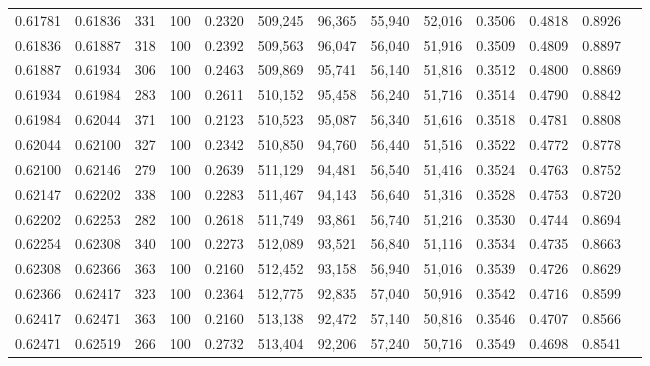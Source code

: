 \begin{tabular}{rrrrrrrrrrrrr}
0.61781 & 0.61836 &   331 & 100 &                                     0.2320 & 509,245 &  96,365 &  55,940 &  52,016 & 0.3506 & 0.4818 & 0.8926 \\
0.61836 & 0.61887 &   318 & 100 &                                     0.2392 & 509,563 &  96,047 &  56,040 &  51,916 & 0.3509 & 0.4809 & 0.8897 \\
0.61887 & 0.61934 &   306 & 100 &                                     0.2463 & 509,869 &  95,741 &  56,140 &  51,816 & 0.3512 & 0.4800 & 0.8869 \\
0.61934 & 0.61984 &   283 & 100 &                                     0.2611 & 510,152 &  95,458 &  56,240 &  51,716 & 0.3514 & 0.4790 & 0.8842 \\
0.61984 & 0.62044 &   371 & 100 &                                     0.2123 & 510,523 &  95,087 &  56,340 &  51,616 & 0.3518 & 0.4781 & 0.8808 \\
0.62044 & 0.62100 &   327 & 100 &                                     0.2342 & 510,850 &  94,760 &  56,440 &  51,516 & 0.3522 & 0.4772 & 0.8778 \\
0.62100 & 0.62146 &   279 & 100 &                                     0.2639 & 511,129 &  94,481 &  56,540 &  51,416 & 0.3524 & 0.4763 & 0.8752 \\
0.62147 & 0.62202 &   338 & 100 &                                     0.2283 & 511,467 &  94,143 &  56,640 &  51,316 & 0.3528 & 0.4753 & 0.8720 \\
0.62202 & 0.62253 &   282 & 100 &                                     0.2618 & 511,749 &  93,861 &  56,740 &  51,216 & 0.3530 & 0.4744 & 0.8694 \\
0.62254 & 0.62308 &   340 & 100 &                                     0.2273 & 512,089 &  93,521 &  56,840 &  51,116 & 0.3534 & 0.4735 & 0.8663 \\
0.62308 & 0.62366 &   363 & 100 &                                     0.2160 & 512,452 &  93,158 &  56,940 &  51,016 & 0.3539 & 0.4726 & 0.8629 \\
0.62366 & 0.62417 &   323 & 100 &                                     0.2364 & 512,775 &  92,835 &  57,040 &  50,916 & 0.3542 & 0.4716 & 0.8599 \\
0.62417 & 0.62471 &   363 & 100 &                                     0.2160 & 513,138 &  92,472 &  57,140 &  50,816 & 0.3546 & 0.4707 & 0.8566 \\
0.62471 & 0.62519 &   266 & 100 &                                     0.2732 & 513,404 &  92,206 &  57,240 &  50,716 & 0.3549 & 0.4698 & 0.8541 \\

\end{tabular}
